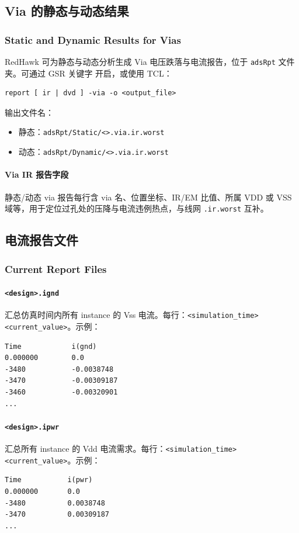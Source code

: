 \subsection{Via 的静态与动态结果}
\subsubsection*{Static and Dynamic Results for Vias}

RedHawk 可为静态与动态分析生成 Via 电压跌落与电流报告，位于 \texttt{adsRpt} 文件夹。可通过 GSR 关键字  开启，或使用 TCL：
\begin{lstlisting}
report [ ir | dvd ] -via -o <output_file>
\end{lstlisting}
输出文件名：
\begin{itemize}
  \item 静态：\texttt{adsRpt/Static/<>.via.ir.worst}
  \item 动态：\texttt{adsRpt/Dynamic/<>.via.ir.worst}
\end{itemize}


\paragraph{Via IR 报告字段}
静态/动态 via 报告每行含 via 名、位置坐标、IR/EM 比值、所属 VDD 或 VSS 域等，用于定位过孔处的压降与电流违例热点，与线网 \texttt{.ir.worst} 互补。

\subsection{电流报告文件}
\subsubsection*{Current Report Files}

\paragraph{\texttt{<design>.ignd}}
汇总仿真时间内所有 instance 的 Vss 电流。每行：\texttt{<simulation\_time> <current\_value>}。示例：
\begin{lstlisting}
Time            i(gnd)
0.000000        0.0
-3480           -0.0038748
-3470           -0.00309187
-3460           -0.00320901
...
\end{lstlisting}

\paragraph{\texttt{<design>.ipwr}}
汇总所有 instance 的 Vdd 电流需求。每行：\texttt{<simulation\_time> <current\_value>}。示例：
\begin{lstlisting}
Time           i(pwr)
0.000000       0.0
-3480          0.0038748
-3470          0.00309187
...
\end{lstlisting}

